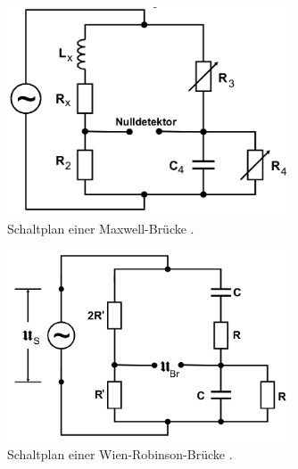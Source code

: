 \begin{figure}[H]
    \centering
    \includegraphics[width=0.75\textwidth]{dateien/aufgabed).png}
    \caption{Schaltplan einer Maxwell-Brücke \cite{anleitung}.}
    \label{fig:schaltungd}
\end{figure}

\begin{figure}[H]
    \centering
    \includegraphics[width=0.75\textwidth]{dateien/aufgabee).png}
    \caption{Schaltplan einer Wien-Robinson-Brücke \cite{anleitung}.}
    \label{fig:schaltunge}
\end{figure}